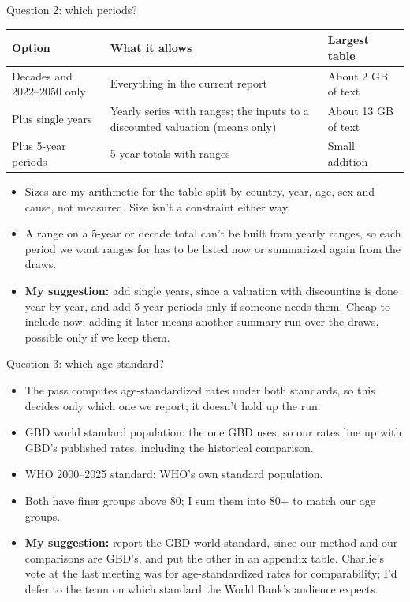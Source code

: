 \documentclass[aspectratio=169,11pt]{beamer}
\begin{document}
\begin{frame}{Question 2: which periods?}
  \small
  \begin{tabular}{L{0.25\textwidth}L{0.33\textwidth}L{0.30\textwidth}}
    \toprule
    Option & What it allows & Largest table \\
    \midrule
    Decades and 2022--2050 only & Everything in the current report & About 2 GB of text \\
    Plus single years & Yearly series with ranges; the inputs to a discounted valuation (means only) & About 13 GB of text \\
    Plus 5-year periods & 5-year totals with ranges & Small addition \\
    \bottomrule
  \end{tabular}

  \medskip
  \raggedright\footnotesize
  \begin{itemize}
    \item Sizes are my arithmetic for the table split by country, year, age, sex and cause, not measured. Size isn't a constraint either way.
    \item A range on a 5-year or decade total can't be built from yearly ranges, so each period we want ranges for has to be listed now or summarized again from the draws.
    \item \textbf{My suggestion:} add single years, since a valuation with discounting is done year by year, and add 5-year periods only if someone needs them. Cheap to include now; adding it later means another summary run over the draws, possible only if we keep them.
  \end{itemize}
\end{frame}

\begin{frame}{Question 3: which age standard?}
  \small
  \begin{itemize}
    \item The pass computes age-standardized rates under both standards, so this decides only which one we report; it doesn't hold up the run.
    \item GBD world standard population: the one GBD uses, so our rates line up with GBD's published rates, including the historical comparison.
    \item WHO 2000--2025 standard: WHO's own standard population.
    \item Both have finer groups above 80; I sum them into 80+ to match our age groups.
    \item \textbf{My suggestion:} report the GBD world standard, since our method and our comparisons are GBD's, and put the other in an appendix table. Charlie's vote at the last meeting was for age-standardized rates for comparability; I'd defer to the team on which standard the World Bank's audience expects.
  \end{itemize}
\end{frame}
\end{document}
